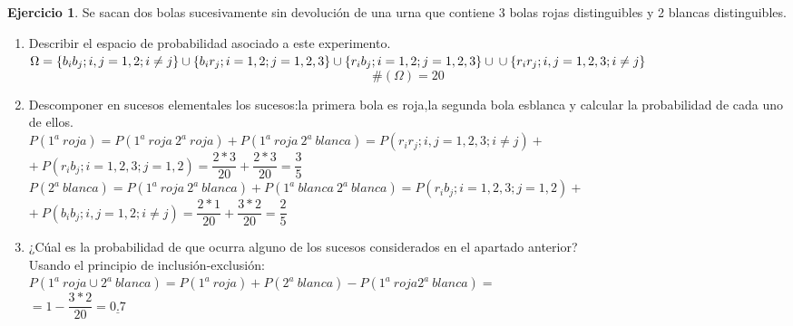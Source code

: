 \documentclass[a4paper, 12pt]{article}
\theoremstyle{definition}
\newtheorem{ej}{Ejercicio}
\begin{document}
\newpage

\begin{ej}
Se sacan dos bolas sucesivamente sin devolución de una urna que contiene 3 bolas rojas distinguibles y 2 blancas distinguibles. \\
\begin{enumerate}[label=\textit{\alph*)}]
    \item Describir el espacio de probabilidad asociado a este experimento.\\
    $\Omega =
    \{b_i b_j; i,j=1,2 ;i \neq j \} \cup \{ b_i r_j; i=1,2 ; j= 1,2,3\} \cup  \{ r_i b_j; i=1,2 ; j= 1,2,3\} \cup \\ \cup \{ r_i r_j; i,j=1,2,3; i\neq j\} $ 
    $$\#(\Omega) = 20$$
    \item Descomponer en sucesos elementales los sucesos:la primera bola es roja,la segunda bola esblanca y calcular la probabilidad de cada uno de ellos. \\
    $P(1^a \ roja) = P(1^a \ roja \ 2^a \ roja) + P(1^a \ roja \ 2^a \ blanca) = P(r_i r_j; i,j=1,2,3; i\neq j) +$\\$+ \ P(r_i b_j; i=1,2,3 ; j= 1,2) = \dfrac{2*3}{20} + \dfrac{2*3}{20} = \dfrac{3}{5}$ \\
    $P(2^a \ blanca) = P(1^a \ roja \ 2^a \ blanca) + P(1^a \ blanca \ 2^a \ blanca) = P(r_i b_j; i=1,2,3 ; j= 1,2) +$\\$+ \ P(b_i b_j; i,j=1,2 ;i \neq j) = \dfrac{2*1}{20} + \dfrac{3*2}{20} = \dfrac{2}{5}$
    \item ¿Cúal es la probabilidad de que ocurra alguno de los sucesos considerados en el apartado anterior?\\
    Usando el principio de inclusión-exclusión: \\
    $P(1^a \ roja \cup 2^a \ blanca) = P(1^a \ roja) + P(2^a \ blanca) - P(1^a \ roja 2^a \ blanca) =$\\$= 1- \dfrac{3*2}{20} = \underline{0.7}$
    
\end{enumerate}
\end{ej}
\end{document}
